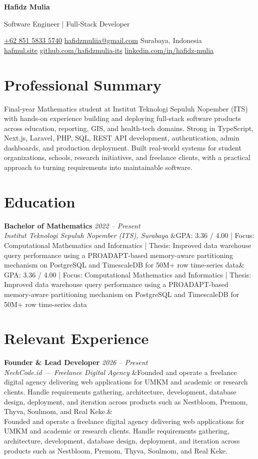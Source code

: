 \documentclass[a4paper,11pt]{article}
\newcommand{\cvname}[1]{%
  {\centering\LARGE\bfseries #1\par\vspace{2pt}}%
}
\newcommand{\cvtitle}[1]{%
  {\centering\large\color{accent} #1\par\vspace{4pt}}%
}
\newcommand{\cvcontact}[1]{%
  {\centering\small #1\par\vspace{6pt}}%
}
\newcommand{\cventry}[4]{%
  \noindent\textbf{#1} \hfill \textit{#3} \\
  \textit{#2}
  \ifx&#4& \else \\ \small #4 \fi
  \vspace{6pt}
}
\begin{document}
\cvname{Hafidz Mulia}
\cvtitle{Software Engineer | Full-Stack Developer}
\cvcontact{%
  \href{tel:+6285158335740}{+62 851 5833 5740} \quad\textbar\quad
  \href{mailto:hafidzmuliia@gmail.com}{hafidzmuliia@gmail.com} \quad\textbar\quad
  Surabaya, Indonesia \\
  \href{https://hafmul.site}{hafmul.site} \quad\textbar\quad
  \href{https://github.com/hafidzmulia-its}{github.com/hafidzmulia-its} \quad\textbar\quad
  \href{https://www.linkedin.com/in/hafidz-mulia/}{linkedin.com/in/hafidz-mulia}
}

\section{Professional Summary}
Final-year Mathematics student at Institut Teknologi Sepuluh Nopember (ITS) with hands-on experience building and deploying full-stack software products across education, reporting, GIS, and health-tech domains. Strong in TypeScript, Next.js, Laravel, PHP, SQL, REST API development, authentication, admin dashboards, and production deployment. Built real-world systems for student organizations, schools, research initiatives, and freelance clients, with a practical approach to turning requirements into maintainable software.

\section{Education}
\cventry
  {Bachelor of Mathematics}
  {Institut Teknologi Sepuluh Nopember (ITS), Surabaya}
  {2022 -- Present}
  {GPA: 3.36 / 4.00 | Focus: Computational Mathematics and Informatics | Thesis: Improved data warehouse query performance using a PROADAPT-based memory-aware partitioning mechanism on PostgreSQL and TimescaleDB for 50M+ row time-series data}

\section{Relevant Experience}
\cventry
  {Founder \& Lead Developer}
  {NechCode.id --- Freelance Digital Agency}
  {2026 -- Present}
  {Founded and operate a freelance digital agency delivering web applications for UMKM and academic or research clients. Handle requirements gathering, architecture, development, database design, deployment, and iteration across products such as Nestbloom, Premom, Thyva, Soulmom, and Real Keke.}
\end{document}
